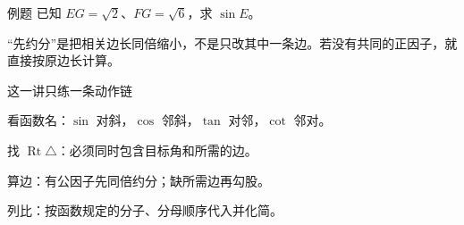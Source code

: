 \documentclass{exam-zh}
\begin{document}
\begin{eduSubQuestionItem}{例题}
已知 $EG=\sqrt2$、$FG=\sqrt6$，求 $\sin E$。\end{eduSubQuestionItem}

\begin{eduDualExplain}
  \begin{eduExplainLeft}
  \end{eduExplainLeft}

  \begin{eduExplainRight}
  \end{eduExplainRight}
\end{eduDualExplain}




\begin{eduMistakeBox}
“先约分”是把相关边长同倍缩小，不是只改其中一条边。若没有共同的正因子，就直接按原边长计算。\end{eduMistakeBox}




\begin{eduSummaryBlock}{\eduIconPin}{这一讲只练一条动作链}
\begin{eduBulletList}
  \item 看函数名：$\sin$ 对斜，$\cos$ 邻斜，$\tan$ 对邻，$\cot$ 邻对。  \item 找 $\operatorname{Rt}\triangle$：必须同时包含目标角和所需的边。  \item 算边：有公因子先同倍约分；缺所需边再勾股。  \item 列比：按函数规定的分子、分母顺序代入并化简。\end{eduBulletList}
\end{eduSummaryBlock}
\end{document}
